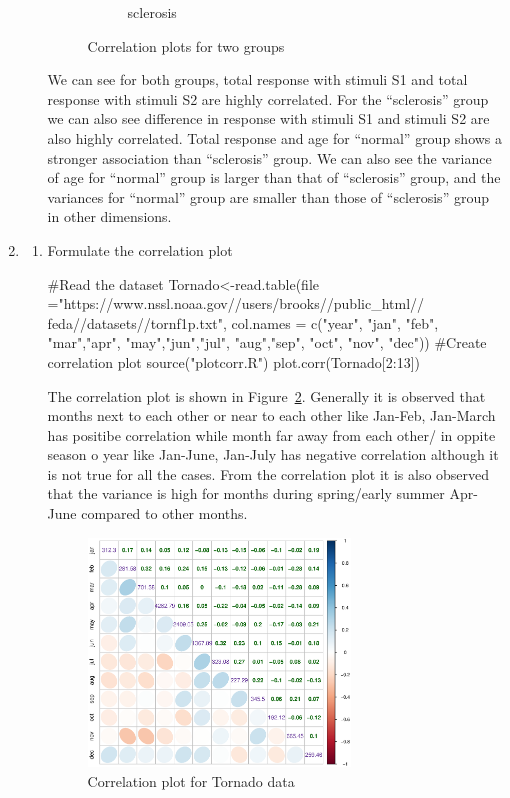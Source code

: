 \documentclass{article}
\begin{document}
\begin{enumerate}[leftmargin = 0 em, label = \arabic*., font = \bfseries]
\begin{enumerate}
\begin{figure}[!htb]
\begin{subfigure}[b]{0.5\textwidth}
		 	\caption{sclerosis}
		 	\end{subfigure}
		 	\caption{Correlation plots for two groups}
		 	\label{2d}
		 \end{figure}
        We can see for both groups, total response with stimuli S1 and total response with stimuli S2 are highly correlated. For the ``sclerosis'' group we can also see difference in response with stimuli S1 and stimuli S2 are also highly correlated. Total response and age for ``normal'' group shows a stronger association than ``sclerosis'' group. We can also see the variance of age for ``normal'' group is larger than that of ``sclerosis'' group, and the variances for ``normal'' group are smaller than those of ``sclerosis'' group in other dimensions. 
	\end{enumerate}
	
	\item 
	\begin{enumerate}
		\item 
		Formulate the correlation plot
		\begin{rcode}
#Read the dataset
Tornado<-read.table(file ="https://www.nssl.noaa.gov//users/brooks//public_html//
feda//datasets//tornf1p.txt", col.names = c("year", "jan", "feb", "mar","apr", "may","jun","jul", "aug","sep", "oct", "nov", "dec"))
#Create correlation plot
source("plotcorr.R")
plot.corr(Tornado[2:13])
		\end{rcode}

		The correlation plot is shown in Figure~\ref{3a}. Generally it is observed that months next to each other or near to each other like Jan-Feb, Jan-March has positibe correlation while month far away from each other/ in oppite season o year like Jan-June, Jan-July has negative correlation although it is not true for all the cases. From the correlation plot it is also observed that the variance is high for months during spring/early summer Apr-June compared to other months.
		\begin{figure}[!htb]
			\centering
			\includegraphics[width = 0.7\textwidth]{3a.eps}
			\caption{Correlation plot for Tornado data}
			\label{3a}
		\end{figure}


\end{enumerate}
\end{enumerate}
\end{document}
